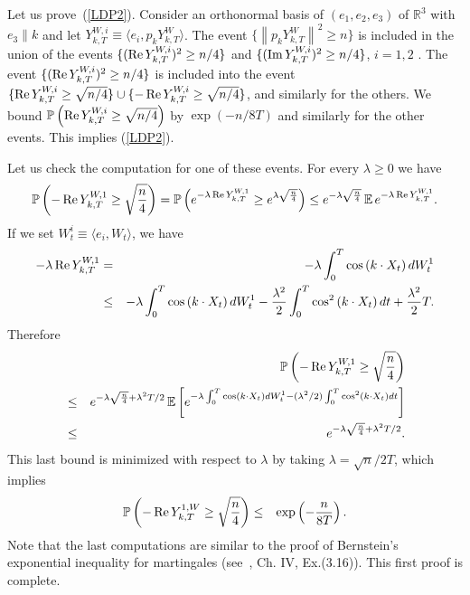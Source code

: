 Let us prove~(\ref{LDP2}). Consider an orthonormal basis of
$(e_1,e_2,e_3)$ of $\mathbb{R}^3$ with $e_3 \| k$ and let
$Y_{k,T}^{W,i} \equiv \langle e_i, p_k Y_{k,T}^{W}\rangle$.
The event $\{\left\| p_k
  Y^W_{k,T}\right\|^{2}\geq n\}$ 
is included in the union of the events $\{(\operatorname{Re} 
Y_{k,T}^{W,i})^{2}\geq n/4\}$ and $\{(\operatorname{Im} Y_{k,T}^{W,i})^{2}\geq n/4\}$, $i=1,2$%
. The event $\{(\operatorname{Re} Y_{k,T}^{W,i})^{2}\geq n/4\}$ is included into the event $%
\{\real Y_{k,T}^{W,i}\geq \sqrt{n/4}\}\cup \{-\real Y_{k,T}^{W,i}\geq \sqrt{n/4}\}$,
and similarly for the others. We bound $\prob\left( \real Y_{k,T}^{W,i}\geq \sqrt{n/4}%
\right) $ by $\exp(-n/8T)$
and similarly for the other events. This implies (\ref{LDP2}). 

Let us check
the computation for one of these events. For every $\lambda \geq 0$ we have 
\begin{equation*}
\operatorname{{\mathbb P}}\left( -\operatorname{Re} Y_{k,T}^{W,1}\geq \sqrt{\frac{n}{4}}\right)  =
\operatorname{{\mathbb P}}\left(
e^{-\lambda \operatorname{Re} Y_{k,T}^{W,1}}\geq e^{\lambda \sqrt{\frac{n}{4}}}\right)  
\leq e^{-\lambda \sqrt{\frac{n}{4}}}\operatorname{{\mathbb E}}
e^{-\lambda \operatorname{Re} Y_{k,T}^{W,1}}.
\end{equation*}
If we set $W^i_t \equiv \langle e_i,W_t\rangle$, we have
\begin{eqnarray*}
-\lambda \operatorname{Re} Y_{k,T}^{W,1} 
&=&-\lambda \int_{0}^{T}\cos \left( k\cdot X_{t}\right) dW^1_{t}
\\
& \le &-\lambda \int_{0}^{T}\cos \left( k\cdot X_{t}\right) dW^1_{t}
-\frac{\lambda^{2}}{2} \int_{0}^{T}\cos ^{2}\left( k\cdot X_{t}\right) dt 
+\frac{\lambda ^{2}}{2} T.
\end{eqnarray*}
Therefore
\begin{eqnarray*}
&&\operatorname{{\mathbb P}}\left( -\operatorname{Re} Y_{k,T}^{W,1}\geq \sqrt{\frac{n}{4}}\right)  \\
&\leq &e^{-\lambda \sqrt{\frac{n}{4}} + \lambda^2 T/2}
\operatorname{{\mathbb E}}\left[ e^{-\lambda \int_{0}^{T}\cos
\left( k\cdot X_{t}\right) dW^1_t 
-(\lambda ^{2}/2) \int_{0}^{T}\cos ^{2}\left( k\cdot X_{t}\right) dt}
\right]  \\
&\leq &e^{-\lambda \sqrt{\frac{n}{4}} +\lambda ^{2}T/2}.
\end{eqnarray*}
This last bound is minimized with respect to $\lambda$ by taking 
$\lambda =\sqrt{n}/2T$, which implies 
\begin{eqnarray*}
\operatorname{{\mathbb P}}
\left( -\operatorname{Re} Y^{1,W}_{k,T} \geq \sqrt{\frac{n}{4}}\right)  &\leq &
\exp\left(-\frac{n}{8 T} \right).
\end{eqnarray*}
Note that the last computations are similar to the proof of Bernstein's
exponential inequality for martingales (see~\cite{R-Y}, Ch. IV, Ex.(3.16)).
This first proof is complete.


